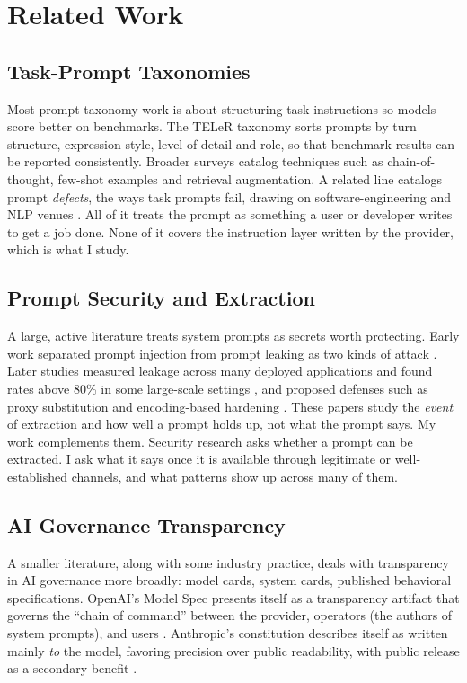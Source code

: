 \documentclass[11pt]{article}
\begin{document}
\section{Related Work}

\subsection{Task-Prompt Taxonomies}
Most prompt-taxonomy work is about structuring task instructions so models
score better on benchmarks. The TELeR taxonomy \citep{teler2023} sorts prompts
by turn structure, expression style, level of detail and role, so that
benchmark results can be reported consistently. Broader surveys
\citep{liu2024survey} catalog techniques such as chain-of-thought, few-shot
examples and retrieval augmentation. A related line catalogs prompt
\emph{defects}, the ways task prompts fail, drawing on software-engineering
and NLP venues \citep{promptdefects2025}. All of it treats the prompt as
something a user or developer writes to get a job done. None of it covers the
instruction layer written by the provider, which is what I study.

\subsection{Prompt Security and Extraction}
A large, active literature treats system prompts as secrets worth protecting.
Early work separated prompt injection from prompt leaking as two kinds of
attack \citep{perez2022}. Later studies measured leakage across many deployed
applications and found rates above 80\% in some large-scale settings
\citep{promptleak2026}, and proposed defenses such as proxy substitution
\citep{proxyprompt2025} and encoding-based hardening
\citep{encodingdefense2026}. These papers study the \emph{event} of
extraction and how well a prompt holds up, not what the prompt says. My work
complements them. Security research asks whether a prompt can be extracted. I
ask what it says once it is available through legitimate or well-established
channels, and what patterns show up across many of them.

\subsection{AI Governance Transparency}
A smaller literature, along with some industry practice, deals with
transparency in AI governance more broadly: model cards, system cards,
published behavioral specifications. OpenAI's Model Spec presents itself as a
transparency artifact that governs the ``chain of command'' between the
provider, operators (the authors of system prompts), and users
\citep{openai2025modelspec}. Anthropic's constitution describes itself as
written mainly \emph{to} the model, favoring precision over public
readability, with public release as a secondary benefit
\citep{anthropic2026constitution}.
\end{document}
